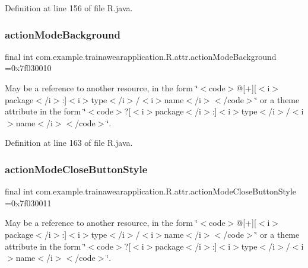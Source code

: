 Definition at line 156 of file R.\+java.

\mbox{\label{classcom_1_1example_1_1trainawearapplication_1_1_r_1_1attr_adb9c36a11b8bcfec1af8112b170c414a}} 
\subsubsection{\texorpdfstring{actionModeBackground}{actionModeBackground}}
{\footnotesize\ttfamily final int com.\+example.\+trainawearapplication.\+R.\+attr.\+action\+Mode\+Background =0x7f030010\hspace{0.3cm}{\ttfamily [static]}}

May be a reference to another resource, in the form \char`\"{}$<$code$>$@\mbox{[}+\mbox{]}\mbox{[}$<$i$>$package$<$/i$>$\+:\mbox{]}$<$i$>$type$<$/i$>$/$<$i$>$name$<$/i$>$$<$/code$>$\char`\"{} or a theme attribute in the form \char`\"{}$<$code$>$?\mbox{[}$<$i$>$package$<$/i$>$\+:\mbox{]}$<$i$>$type$<$/i$>$/$<$i$>$name$<$/i$>$$<$/code$>$\char`\"{}. 

Definition at line 163 of file R.\+java.

\mbox{\label{classcom_1_1example_1_1trainawearapplication_1_1_r_1_1attr_acf505608f6a075fa857ccc1c9c9083b7}} 
\subsubsection{\texorpdfstring{actionModeCloseButtonStyle}{actionModeCloseButtonStyle}}
{\footnotesize\ttfamily final int com.\+example.\+trainawearapplication.\+R.\+attr.\+action\+Mode\+Close\+Button\+Style =0x7f030011\hspace{0.3cm}{\ttfamily [static]}}

May be a reference to another resource, in the form \char`\"{}$<$code$>$@\mbox{[}+\mbox{]}\mbox{[}$<$i$>$package$<$/i$>$\+:\mbox{]}$<$i$>$type$<$/i$>$/$<$i$>$name$<$/i$>$$<$/code$>$\char`\"{} or a theme attribute in the form \char`\"{}$<$code$>$?\mbox{[}$<$i$>$package$<$/i$>$\+:\mbox{]}$<$i$>$type$<$/i$>$/$<$i$>$name$<$/i$>$$<$/code$>$\char`\"{}. 

